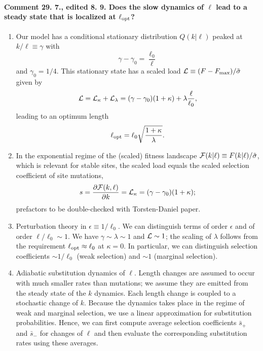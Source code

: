\documentclass[10pt,a4paper]{article}
\newcommand{\ep}{\epsilon}
\renewcommand{\L}{{\cal L}}
\newcommand{\F}{{\cal F}}
\newcommand{\comment}[1]{{\noindent \color{blue} #1}}
\newcommand{\EQ}{\begin{equation}}
\newcommand{\EE}{\end{equation}}
\begin{document}
\newpage 
\comment{
\paragraph{Comment 29. 7., edited 8. 9. Does the slow dynamics of $\ell$ lead to a steady state that is localized at $\ell_{\rm opt}$?}
\begin{enumerate}
\item Our model has a conditional stationary distribution $Q(k|\ell)$ peaked at $k/\ell \equiv \gamma$ with
\EQ
\gamma - \gamma_0 = \frac{\ell_0}{\ell}
\EE
and $\gamma_0 = 1/4$. This stationary state has a scaled load $\L \equiv (F - F_{\max})/ \tilde \sigma$ given by
\EQ
\L = \L_\kappa + \L_\lambda = (\gamma - \gamma_0) (1 + \kappa) + \lambda  \frac{\ell}{\ell_0},
\EE
leading to an optimum length
\EQ
\ell_{\rm opt} = \ell_0 \sqrt{\frac{1+\kappa}{\lambda}}.
\EE

\item In the exponential regime of the (scaled) fitness landscape $\F(k |\ell) \equiv F(k|\ell) / \tilde \sigma$, which is relevant for stable sites, the scaled load equals the scaled selection coefficient of site mutations,
\EQ
s = \frac{\partial \F(k,\ell)}{\partial k} = \L_\kappa = (\gamma - \gamma_0) (1 + \kappa);
\EE
prefactors to be double-checked with Torsten-Daniel paper.

\item Perturbation theory in $\ep \equiv 1/\ell_0$. We can distinguish terms of order $\ep$ and of order $\ell/\ell_0 \sim 1$. We have $\gamma \sim \lambda \sim 1$ and $\L \sim 1$; the scaling of $\lambda$ follows from the requirement $\ell_{\rm opt} \approx \ell_0$ at $\kappa = 0$. In particular, we can distinguish selection coefficients $ \sim 1/\ell_0$ (weak selection) and $ \sim 1$ (marginal selection).

\item Adiabatic substitution dynamics of $\ell$. Length changes are assumed to occur with much smaller rates than mutations; we assume they are emitted from the steady state of the $k$ dynamics. Each length change is coupled to a stochastic change of $k$. Because the dynamics takes place in the regime of weak and marginal selection, we use a linear approximation for substitution probabilities. Hence, we can first compute average selection coefficients $\bar s_+$ and $\bar s_-$ for changes of $\ell$ and then evaluate the corresponding substitution rates using these averages.


\end{enumerate}}
\end{document}
